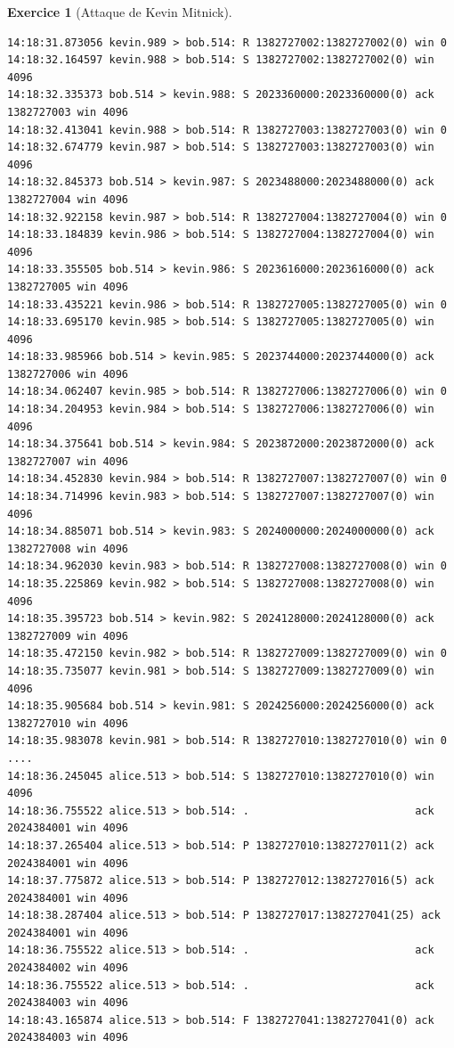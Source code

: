 \documentclass[a4paper,9pt]{article}
\theoremstyle{plain}
\theoremstyle{definition}
\newtheorem{exercice}{Exercice}
\begin{document}
\begin{exercice}[Attaque de Kevin Mitnick]
\begin{verbatim}
14:18:31.873056 kevin.989 > bob.514: R 1382727002:1382727002(0) win 0
14:18:32.164597 kevin.988 > bob.514: S 1382727002:1382727002(0) win 4096
14:18:32.335373 bob.514 > kevin.988: S 2023360000:2023360000(0) ack 1382727003 win 4096
14:18:32.413041 kevin.988 > bob.514: R 1382727003:1382727003(0) win 0
14:18:32.674779 kevin.987 > bob.514: S 1382727003:1382727003(0) win 4096
14:18:32.845373 bob.514 > kevin.987: S 2023488000:2023488000(0) ack 1382727004 win 4096
14:18:32.922158 kevin.987 > bob.514: R 1382727004:1382727004(0) win 0
14:18:33.184839 kevin.986 > bob.514: S 1382727004:1382727004(0) win 4096
14:18:33.355505 bob.514 > kevin.986: S 2023616000:2023616000(0) ack 1382727005 win 4096
14:18:33.435221 kevin.986 > bob.514: R 1382727005:1382727005(0) win 0
14:18:33.695170 kevin.985 > bob.514: S 1382727005:1382727005(0) win 4096
14:18:33.985966 bob.514 > kevin.985: S 2023744000:2023744000(0) ack 1382727006 win 4096
14:18:34.062407 kevin.985 > bob.514: R 1382727006:1382727006(0) win 0
14:18:34.204953 kevin.984 > bob.514: S 1382727006:1382727006(0) win 4096
14:18:34.375641 bob.514 > kevin.984: S 2023872000:2023872000(0) ack 1382727007 win 4096
14:18:34.452830 kevin.984 > bob.514: R 1382727007:1382727007(0) win 0
14:18:34.714996 kevin.983 > bob.514: S 1382727007:1382727007(0) win 4096
14:18:34.885071 bob.514 > kevin.983: S 2024000000:2024000000(0) ack 1382727008 win 4096
14:18:34.962030 kevin.983 > bob.514: R 1382727008:1382727008(0) win 0
14:18:35.225869 kevin.982 > bob.514: S 1382727008:1382727008(0) win 4096
14:18:35.395723 bob.514 > kevin.982: S 2024128000:2024128000(0) ack 1382727009 win 4096
14:18:35.472150 kevin.982 > bob.514: R 1382727009:1382727009(0) win 0
14:18:35.735077 kevin.981 > bob.514: S 1382727009:1382727009(0) win 4096
14:18:35.905684 bob.514 > kevin.981: S 2024256000:2024256000(0) ack 1382727010 win 4096
14:18:35.983078 kevin.981 > bob.514: R 1382727010:1382727010(0) win 0
....
14:18:36.245045 alice.513 > bob.514: S 1382727010:1382727010(0) win 4096
14:18:36.755522 alice.513 > bob.514: .                          ack 2024384001 win 4096
14:18:37.265404 alice.513 > bob.514: P 1382727010:1382727011(2) ack 2024384001 win 4096
14:18:37.775872 alice.513 > bob.514: P 1382727012:1382727016(5) ack 2024384001 win 4096
14:18:38.287404 alice.513 > bob.514: P 1382727017:1382727041(25) ack 2024384001 win 4096
14:18:36.755522 alice.513 > bob.514: .                          ack 2024384002 win 4096
14:18:36.755522 alice.513 > bob.514: .                          ack 2024384003 win 4096
14:18:43.165874 alice.513 > bob.514: F 1382727041:1382727041(0) ack 2024384003 win 4096

\end{verbatim}
\end{exercice}
\end{document}
